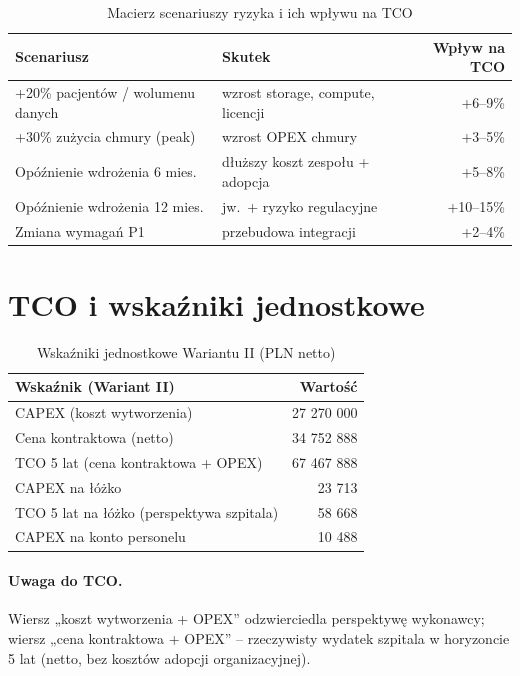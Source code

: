 \begin{table}[h]
\centering
\small
\renewcommand{\arraystretch}{1.2}
\begin{tabular}{|L{6.5cm}|L{4.5cm}|r|}
\hline
{}\textbf{Scenariusz} & \textbf{Skutek} & \textbf{Wpływ na TCO} \\
\hline
+20\% pacjentów / wolumenu danych & wzrost storage, compute, licencji & +6--9\% \\
\hline
+30\% zużycia chmury (peak) & wzrost OPEX chmury & +3--5\% \\
\hline
Opóźnienie wdrożenia 6 mies. & dłuższy koszt zespołu + adopcja & +5--8\% \\
\hline
Opóźnienie wdrożenia 12 mies. & jw.~+ ryzyko regulacyjne & +10--15\% \\
\hline
Zmiana wymagań P1 & przebudowa integracji & +2--4\% \\
\hline
\end{tabular}
\caption{Macierz scenariuszy ryzyka i ich wpływu na TCO}
\label{tab:macierz_ryzyka}
\end{table}

\section{TCO i wskaźniki jednostkowe}
\label{sec:wskazniki}

\begin{table}[h]
\centering
\small
\renewcommand{\arraystretch}{1.2}
\begin{tabular}{|L{8.5cm}|r|}
\hline
{}\textbf{Wskaźnik (Wariant II)} & \textbf{Wartość} \\
\hline
CAPEX (koszt wytworzenia) & 27 270 000 \\
\hline
Cena kontraktowa (netto) & 34 752 888 \\
\hline
TCO 5 lat (cena kontraktowa + OPEX) & 67 467 888 \\
\hline
CAPEX na łóżko & 23 713 \\
\hline
TCO 5 lat na łóżko (perspektywa szpitala) & 58 668 \\
\hline
CAPEX na konto personelu & 10 488 \\
\hline
\end{tabular}
\caption{Wskaźniki jednostkowe Wariantu II (PLN netto)}
\label{tab:wskazniki}
\end{table}

\paragraph{Uwaga do TCO.} Wiersz „koszt wytworzenia + OPEX” odzwierciedla perspektywę wykonawcy; wiersz „cena kontraktowa + OPEX” -- rzeczywisty wydatek szpitala w horyzoncie 5 lat (netto, bez kosztów adopcji organizacyjnej).

